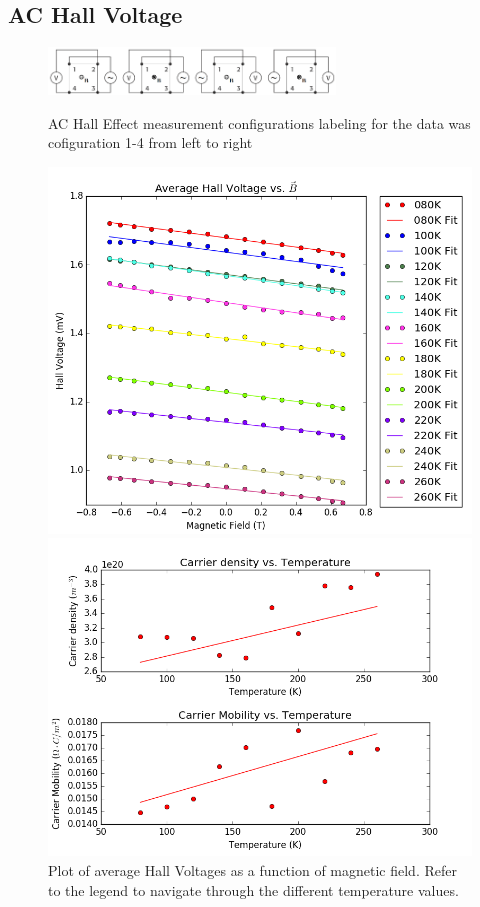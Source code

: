 \documentclass[twocolumn]{article}
\begin{document}
\subsection{AC Hall Voltage}
\begin{figure}
\begin{minipage}{\textwidth}
\includegraphics[width=0.6\linewidth,height=0.5in]{hall-config.png}
\caption{AC Hall Effect measurement configurations labeling for the data was 
cofiguration 1-4 from left to right \cite{ref:3}}
\label{fig:15}
\end{minipage}
\vfill
\begin{minipage}[t]{0.46\textwidth}
\includegraphics[width=\linewidth]{average-hall-volt.png}
\caption{Plot of average Hall Voltages as a function of magnetic field. Refer
to the legend to navigate through the different temperature values.}
\label{fig:16}
\end{minipage}
\hfill
\begin{minipage}[t]{0.46\textwidth}
\includegraphics[width=\linewidth]{carrier-mobility-density.png}

\end{minipage}
\end{figure}
\end{document}
